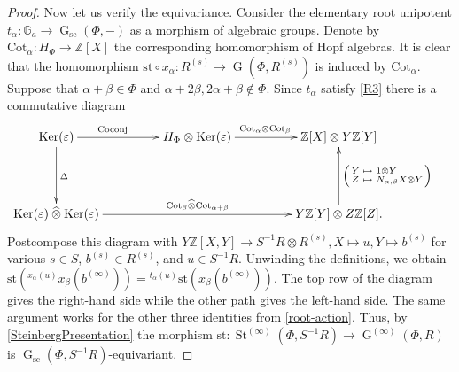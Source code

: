 \documentclass[oneside, 11pt]{amsart}
\numberwithin{equation}{section}
\theoremstyle{definition}
\theoremstyle{remark}
\DeclareMathOperator\St{St}
\DeclareMathOperator\Ker{Ker}
\DeclareMathOperator\GG{G}
\newcommand{\otimeshat}{\mathbin{\widehat{\otimes}}}
\newcommand{\up}[2]{{^{#1}\!{#2}}}
\begin{document}
\begin{proof}
 Now let us verify the equivariance. 
 Consider the elementary root unipotent \(t_\alpha \colon \mathbb{G}_a \to \GG_{\mathrm{sc}}(\Phi, -)\) as a morphism of algebraic groups.
 Denote by \(\mathrm{Cot}_\alpha \colon H_\Phi \to \mathbb Z[X]\) the corresponding homomorphism of Hopf algebras. It is clear that the homomorphism \(\mathrm{st} \circ x_\alpha \colon R^{(s)} \to \GG(\Phi, R^{(s)})\) is induced by \(\mathrm{Cot}_\alpha\).
 Suppose that \(\alpha + \beta \in \Phi\) and \(\alpha + 2\beta, 2\alpha + \beta \notin \Phi\).
 Since $t_\alpha$ satisfy \eqref{R3} there is a commutative diagram
 \[\xymatrix@+1.8pc{
 \Ker(\varepsilon) \ar[r]^(.4){\mathrm{Coconj}} \ar[d]^{\Delta} &
 H_\Phi \otimes \Ker(\varepsilon) \ar[r]^(0.48){\mathrm{Cot}_\alpha \otimes \mathrm{Cot}_\beta} &
 \mathbb Z[X] \otimes Y \mathbb Z[Y]\\
 \Ker(\varepsilon) \otimeshat \Ker(\varepsilon) \ar[rr]^{\mathrm{Cot}_\beta \otimeshat \mathrm{Cot}_{\alpha + \beta}} &&
 Y \mathbb Z[Y] \otimes Z \mathbb Z[Z]. \ar[u]_{\begin{psmallmatrix*}[l] Y & \mapsto & 1 \otimes Y\\ Z & \mapsto & N_{\alpha,\beta} X \otimes Y \end{psmallmatrix*}} &
 }\]
 Postcompose this diagram with \(Y \mathbb Z[X, Y] \to S^{-1} R \otimes R^{(s)}, X \mapsto u, Y \mapsto b^{(s)}\) for various \(s \in S\), \(b^{(s)} \in R^{(s)}\), and \(u \in S^{-1} R\). Unwinding the definitions, we obtain  \(\mathrm{st}(\up{x_\alpha(u)}{x_\beta(b^{(\infty)})}) = \up{t_\alpha(u)}{\mathrm{st}(x_\beta(b^{(\infty)}))}\). The top row of the diagram gives the right-hand side while the other path gives the left-hand side. The same argument works for the other three identities from \cref{root-action}. Thus, by \cref{SteinbergPresentation} the morphism \(\mathrm{st} \colon \St^{(\infty)}(\Phi, S^{-1} R) \to \GG^{(\infty)}(\Phi, R)\) is \(\GG_{\mathrm{sc}}(\Phi, S^{-1} R)\)-equivariant.

\end{proof}
\end{document}
